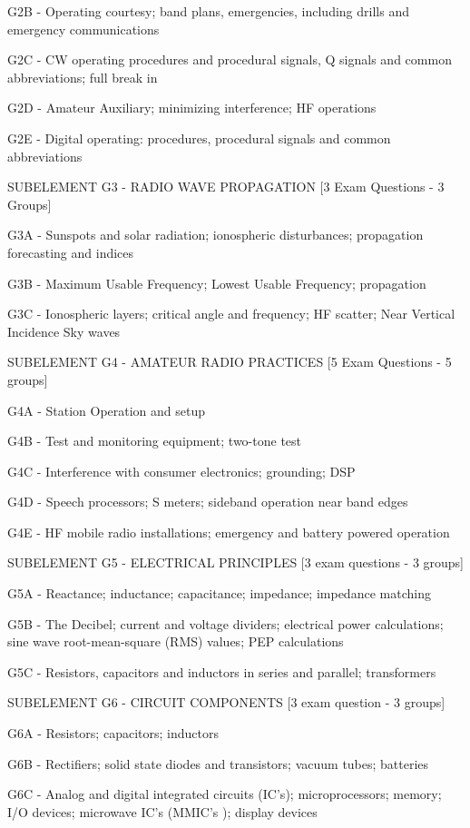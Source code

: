 \documentclass[12pt,letterpaper]{report}
\begin{document}
G2B - Operating courtesy; band plans, emergencies, including drills and emergency communications

G2C - CW operating procedures and procedural signals, Q signals and common abbreviations; full break in

G2D - Amateur Auxiliary; minimizing interference; HF operations

G2E - Digital operating: procedures, procedural signals and common abbreviations

SUBELEMENT G3 - RADIO WAVE PROPAGATION [3 Exam Questions - 3 Groups]

G3A - Sunspots and solar radiation; ionospheric disturbances; propagation forecasting and indices

G3B - Maximum Usable Frequency; Lowest Usable Frequency; propagation

G3C - Ionospheric layers; critical angle and frequency; HF scatter; Near Vertical Incidence Sky waves

SUBELEMENT G4 - AMATEUR RADIO PRACTICES [5 Exam Questions - 5 groups]

G4A - Station Operation and setup

G4B - Test and monitoring equipment; two-tone test

G4C - Interference with consumer electronics; grounding; DSP

G4D - Speech processors; S meters; sideband operation near band edges

G4E - HF mobile radio installations; emergency and battery powered operation

SUBELEMENT G5 - ELECTRICAL PRINCIPLES [3 exam questions - 3 groups]

G5A - Reactance; inductance; capacitance; impedance; impedance matching

G5B - The Decibel; current and voltage dividers; electrical power calculations; sine wave root-mean-square (RMS) values; PEP calculations

G5C - Resistors, capacitors and inductors in series and parallel; transformers

SUBELEMENT G6 - CIRCUIT COMPONENTS [3 exam question - 3 groups]

G6A - Resistors; capacitors; inductors

G6B - Rectifiers; solid state diodes and transistors; vacuum tubes; batteries

G6C - Analog and digital integrated circuits (IC's); microprocessors; memory; I/O devices; microwave IC's (MMIC's ); display devices
\end{document}
